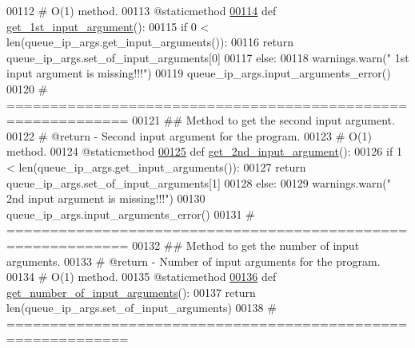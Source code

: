 \begin{DoxyCode}
00112     \textcolor{comment}{#   O(1) method.}
00113     @staticmethod
\hypertarget{queue__ip__arguments_8py_source_l00114}{}\hyperlink{classutilities_1_1queue__ip__arguments_1_1queue__ip__args_a7b3c5efad539fadfb53eda0cfb8d3f03}{00114}     \textcolor{keyword}{def }\hyperlink{classutilities_1_1queue__ip__arguments_1_1queue__ip__args_a7b3c5efad539fadfb53eda0cfb8d3f03}{get\_1st\_input\_argument}():
00115         \textcolor{keywordflow}{if} 0 < len(queue\_ip\_args.get\_input\_arguments()):
00116             \textcolor{keywordflow}{return} queue\_ip\_args.set\_of\_input\_arguments[0]
00117         \textcolor{keywordflow}{else}:
00118             warnings.warn(\textcolor{stringliteral}{" 1st input argument is missing!!!"})
00119             queue\_ip\_args.input\_arguments\_error()
00120     \textcolor{comment}{# ============================================================}
00121     \textcolor{comment}{##  Method to get the second input argument.}
00122     \textcolor{comment}{#   @return - Second input argument for the program.}
00123     \textcolor{comment}{#   O(1) method.}
00124     @staticmethod
\hypertarget{queue__ip__arguments_8py_source_l00125}{}\hyperlink{classutilities_1_1queue__ip__arguments_1_1queue__ip__args_a18e59da1e2c8044e79ca32a5455ef40b}{00125}     \textcolor{keyword}{def }\hyperlink{classutilities_1_1queue__ip__arguments_1_1queue__ip__args_a18e59da1e2c8044e79ca32a5455ef40b}{get\_2nd\_input\_argument}():
00126         \textcolor{keywordflow}{if} 1 < len(queue\_ip\_args.get\_input\_arguments()):
00127             \textcolor{keywordflow}{return} queue\_ip\_args.set\_of\_input\_arguments[1]
00128         \textcolor{keywordflow}{else}:
00129             warnings.warn(\textcolor{stringliteral}{" 2nd input argument is missing!!!"})
00130             queue\_ip\_args.input\_arguments\_error()
00131     \textcolor{comment}{# ============================================================}
00132     \textcolor{comment}{##  Method to get the number of input arguments.}
00133     \textcolor{comment}{#   @return - Number of input arguments for the program.}
00134     \textcolor{comment}{#   O(1) method.}
00135     @staticmethod
\hypertarget{queue__ip__arguments_8py_source_l00136}{}\hyperlink{classutilities_1_1queue__ip__arguments_1_1queue__ip__args_ab95a4242fd55bf5d126b35a5f5172593}{00136}     \textcolor{keyword}{def }\hyperlink{classutilities_1_1queue__ip__arguments_1_1queue__ip__args_ab95a4242fd55bf5d126b35a5f5172593}{get\_number\_of\_input\_arguments}():
00137         \textcolor{keywordflow}{return} len(queue\_ip\_args.set\_of\_input\_arguments)
00138     \textcolor{comment}{# ============================================================}

\end{DoxyCode}
